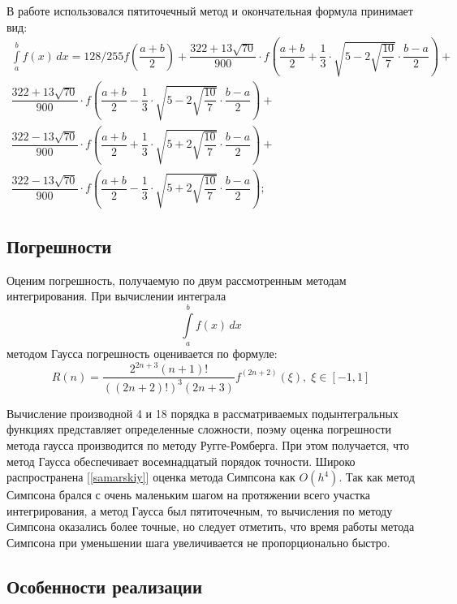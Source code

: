 В работе использовался пятиточечный метод и окончательная формула принимает вид:
\begin{equation}
\begin{split}
	\int\limits_a^b f(x)\,dx =  128/255 f(\dfrac{a+b}{2})+
  \dfrac{322+13\sqrt{70}}{900}\cdot f\left(\dfrac{a+b}{2} + \dfrac 13\cdot \sqrt{5-2\sqrt{\dfrac{10}{7}}}\cdot\dfrac{b-a}{2}\right) +\\
  \dfrac{322+13\sqrt{70}}{900}\cdot f\left(\dfrac{a+b}{2} - \dfrac 13\cdot \sqrt{5-2\sqrt{\dfrac{10}{7}}}\cdot\dfrac{b-a}{2}\right) +\\
  \dfrac{322-13\sqrt{70}}{900}\cdot f\left(\dfrac{a+b}{2} + \dfrac 13\cdot \sqrt{5+2\sqrt{\dfrac{10}{7}}}\cdot\dfrac{b-a}{2}\right) +\\
  \dfrac{322-13\sqrt{70}}{900}\cdot f\left(\dfrac{a+b}{2} - \dfrac 13\cdot \sqrt{5+2\sqrt{\dfrac{10}{7}}}\cdot\dfrac{b-a}{2}\right);
\end{split}
\end{equation}

\subsection{Погрешности}
Оценим погрешность, получаемую по двум рассмотренным методам интегрирования.
При вычислении интеграла 
\begin{equation}
\int\limits^b_af(x)\,dx
\end{equation}
методом Гаусса погрешность оценивается по формуле:  
\begin{equation}
R(n) = \dfrac{2^{2n+3}(n+1)!}{((2n+2)!)^3(2n+3)}f^{(2n+2)}(\xi),\; \xi \in [-1, 1]
\end{equation}

Вычисление производной 4 и 18 порядка в рассматриваемых подынтегральных функциях представляет определенные сложности,
поэму оценка погрешности метода гаусса производится по методу Ругге-Ромберга. При этом получается, что метод Гаусса 
обеспечивает восемнадцатый порядок точности. Широко распространена [\ref{samarskiy}] оценка метода Симпсона как $O(h^4)$.
Так как метод Симпсона брался с очень маленьким шагом на протяжении всего участка интегрирования, а метод Гаусса был пятиточечным, то вычисления по методу Симпсона оказались более точные, но следует отметить, что время работы метода Симпсона при уменьшении шага увеличивается не пропорционально быстро.
 

\subsection{Особенности реализации}


